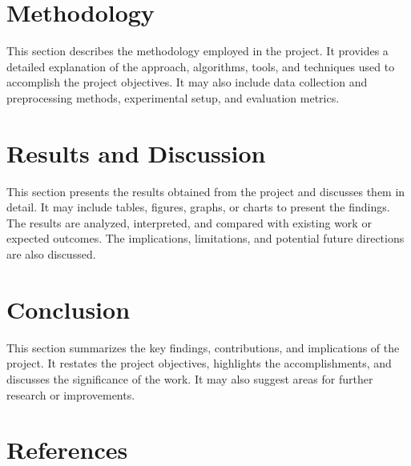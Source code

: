 \documentclass[journal]{IEEEtran}
\begin{document}
	\section{Methodology}
	\label{sec:methodology}
	This section describes the methodology employed in the project. It provides a detailed explanation of the approach, algorithms, tools, and techniques used to accomplish the project objectives. It may also include data collection and preprocessing methods, experimental setup, and evaluation metrics.
	
	\section{Results and Discussion}
	\label{sec:results_discussion}
	This section presents the results obtained from the project and discusses them in detail. It may include tables, figures, graphs, or charts to present the findings. The results are analyzed, interpreted, and compared with existing work or expected outcomes. The implications, limitations, and potential future directions are also discussed.
	
	\section{Conclusion}
	\label{sec:conclusion}
	This section summarizes the key findings, contributions, and implications of the project. It restates the project objectives, highlights the accomplishments, and discusses the significance of the work. It may also suggest areas for further research or improvements.
	
	\section*{References}
	\label{sec:references}
	
	
\end{document}

